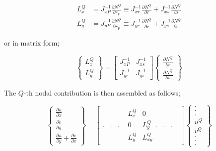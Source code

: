 \begin{align*}
L_x^Q & = J_{xP}^{ - 1}\frac{{\partial {N^Q}}}{{\partial {r_P}}} \equiv J_{xr}^{ - 1}\frac{{\partial {N^Q}}}{{\partial r}} + J_{xs}^{ - 1}\frac{{\partial {N^Q}}}{{\partial s}}\\
L_y^Q & = J_{yP}^{ - 1}\frac{{\partial {N^Q}}}{{\partial {r_P}}} \equiv J_{yr}^{ - 1}\frac{{\partial {N^Q}}}{{\partial r}} + J_{ys}^{ - 1}\frac{{\partial {N^Q}}}{{\partial s}}
\end{align*}

or in matrix form;

\begin{equation}
\left\{ {\begin{array}{*{20}{c}}
{L_x^Q}\\
{L_y^Q}
\end{array}} \right\} = \left[ {\begin{array}{*{20}{c}}
{J_{xP}^{ - 1}}&{J_{xs}^{ - 1}}\\
{J_{yr}^{ - 1}}&{J_{ys}^{ - 1}}
\end{array}} \right]\left\{ {\begin{array}{*{20}{c}}
{\frac{{\partial {N^Q}}}{{\partial r}}}\\
{\frac{{\partial {N^Q}}}{{\partial s}}}
\end{array}} \right\}
\end{equation}

The $Q$-th nodal contribution is then assembled as follows;


\begin{equation}
\left\{ {\begin{array}{*{20}{c}}
{\frac{{\partial u}}{{\partial x}}}\\
{\frac{{\partial v}}{{\partial y}}}\\
{\frac{{\partial u}}{{\partial y}} + \frac{{\partial v}}{{\partial x}}}
\end{array}} \right\} = \left[ {\begin{array}{*{20}{c}}
.&.&.&{\begin{array}{*{20}{c}}
{L_x^Q}&0\\
0&{L_y^Q}\\
{L_y^Q}&{L_{xy}^Q}
\end{array}}.&.&.&
\end{array}}\right]
\left\{ {\begin{array}{*{20}{c}}
.\\
.\\
.\\
{{u^Q}}\\
{{v^Q}}\\
.\\
.\\
.
\end{array}} \right\}
\label{strain inter}
\end{equation}

